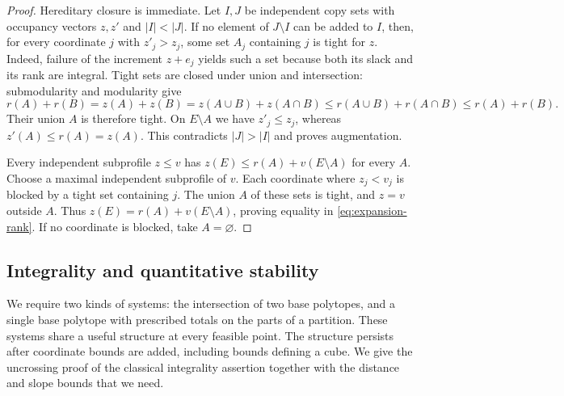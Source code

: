 \begin{proof}
Hereditary closure is immediate.  Let $I,J$ be independent copy sets
with occupancy vectors $z,z'$ and $|I|<|J|$.  If no element of $J\setminus I$
can be added to $I$, then, for every coordinate $j$ with $z'_j>z_j$,
some set $A_j$ containing $j$ is tight for $z$.  Indeed, failure of the
increment $z+e_j$ yields such a set because both its slack and its rank
are integral.  Tight sets are closed under union and intersection:
submodularity and modularity give
\[
 r(A)+r(B)=z(A)+z(B)=z(A\cup B)+z(A\cap B)
 \leq r(A\cup B)+r(A\cap B)\leq r(A)+r(B).
\]
Their union $A$ is therefore tight.  On $E\setminus A$ we have
$z'_j\leq z_j$, whereas $z'(A)\leq r(A)=z(A)$.  This contradicts
$|J|>|I|$ and proves augmentation.

Every independent subprofile $z\leq v$ has
$z(E)\leq r(A)+v(E\setminus A)$ for every $A$.
Choose a maximal independent subprofile of $v$.  Each coordinate where
$z_j<v_j$ is blocked by a tight set containing $j$.  The union $A$ of
these sets is tight, and $z=v$ outside $A$.  Thus
$z(E)=r(A)+v(E\setminus A)$, proving equality in
\eqref{eq:expansion-rank}.  If no coordinate is blocked, take
$A=\varnothing$.
\end{proof}

\subsection{Integrality and quantitative stability}

We require two kinds of systems: the intersection of two base
polytopes, and a single base polytope with prescribed totals on the
parts of a partition.  These systems share a useful structure at every
feasible point.  The structure persists after coordinate bounds are
added, including bounds defining a cube.  We give the uncrossing proof
of the classical integrality assertion \cite{Edmonds1970} together with
the distance and slope bounds that we need.

